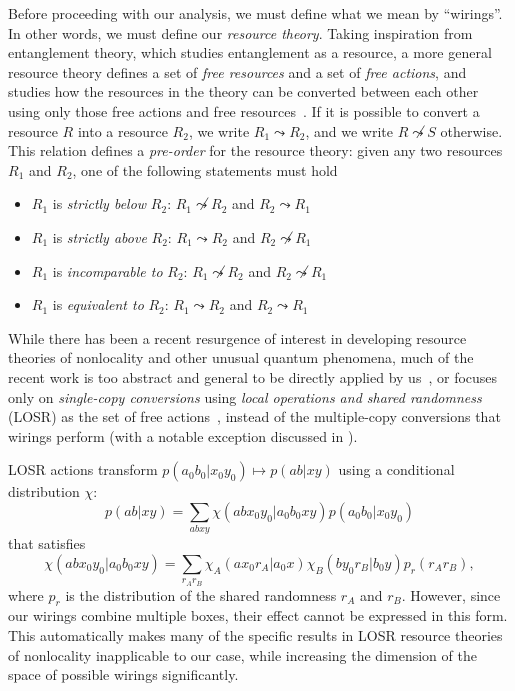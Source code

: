 \documentclass[10pt, a4paper]{article}
\numberwithin{equation}{section} %
\theoremstyle{definition}
\theoremstyle{plain}
\newcommand{\?}{\mathrel{?}} %
\begin{document}
      Before proceeding with our analysis, we must define what we mean by ``wirings''. In other words, we must define our \emph{resource theory}. Taking inspiration from entanglement theory, which studies entanglement as a resource, a more general resource theory defines a set of \emph{free resources} and a set of \emph{free actions}, and studies how the resources in the theory can be converted between each other using only those free actions and free resources~\cite{BellResourceTheory}. If it is possible to convert a resource \(R\) into a resource \(R_2\), we write \(R_1 \leadsto R_2\), and we write \(R \not\leadsto S\) otherwise. This relation defines a \emph{pre-order} for the resource theory: given any two resources \(R_1\) and \(R_2\), one of the following statements must hold
      \begin{itemize}
        \item \(R_1\) is \emph{strictly below} \(R_2\): \(R_1 \not\leadsto R_2\) and \(R_2 \leadsto R_1\)
        \item \(R_1\) is \emph{strictly above} \(R_2\): \(R_1 \leadsto R_2\) and \(R_2 \not\leadsto R_1\)
        \item \(R_1\) is \emph{incomparable to} \(R_2\): \(R_1 \not\leadsto R_2\) and \(R_2 \not\leadsto R_1\)
        \item \(R_1\) is \emph{equivalent to} \(R_2\): \(R_1 \leadsto R_2\) and \(R_2 \leadsto R_1\)
      \end{itemize}

      While there has been a recent resurgence of interest in developing resource theories of nonlocality and other unusual quantum phenomena, much of the recent work is too abstract and general to be directly applied by us~\cite{Monotones, TypeIndepLOSR}, or focuses only on \emph{single-copy conversions} using \emph{local operations and shared randomness} (LOSR) as the set of free actions~\cite{BellResourceTheory, TraceDistNL, NLMeas}, instead of the multiple-copy conversions that wirings perform (with a notable exception discussed in ).

      LOSR actions transform \(p(a_0 b_0|x_0 y_0) \mapsto p(ab|xy)\) using a conditional distribution \(\chi\):
      \begin{equation}
        p(ab|xy) = \sum_{abxy} \chi(abx_0y_0|a_0b_0xy) p(a_0b_0|x_0y_0)
      \end{equation}
      that satisfies
      \begin{equation}
        \chi(abx_0y_0|a_0b_0xy) = \sum_{r_A r_B} \chi_A(ax_0r_A|a_0x) \chi_B(by_0r_B|b_0y) p_r(r_A r_B),
      \end{equation}
      where \(p_r\) is the distribution of the shared randomness \(r_A\) and \(r_B\). However, since our wirings combine multiple boxes, their effect cannot be expressed in this form. This automatically makes many of the specific results in LOSR resource theories of nonlocality inapplicable to our case, while increasing the dimension of the space of possible wirings significantly.
\end{document}
